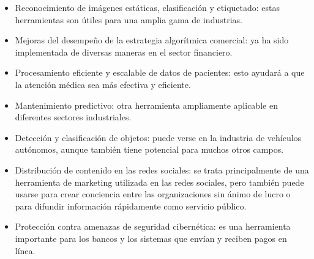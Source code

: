     \begin{itemize}
        \item Reconocimiento de imágenes estáticas, clasificación y etiquetado:  estas herramientas son útiles para una amplia gama de industrias.
        \item Mejoras del desempeño de la estrategia algorítmica comercial: ya ha sido implementada de diversas maneras en el sector financiero.
        \item Procesamiento eficiente y escalable de datos de pacientes: esto ayudará a que la atención médica sea más efectiva y eficiente.
        \item Mantenimiento predictivo: otra herramienta ampliamente aplicable en diferentes sectores industriales.
        \item Detección y clasificación de objetos: puede verse en la industria de vehículos autónomos, aunque también tiene potencial para muchos otros campos.
        \item Distribución de contenido en las redes sociales: se trata principalmente de una herramienta de marketing utilizada en las redes sociales, pero también puede usarse para crear conciencia entre las organizaciones sin ánimo de lucro o para difundir información rápidamente como servicio público.
        \item Protección contra amenazas de seguridad cibernética: es una herramienta importante para los bancos y los sistemas que envían y reciben pagos en línea.
    \end{itemize}

